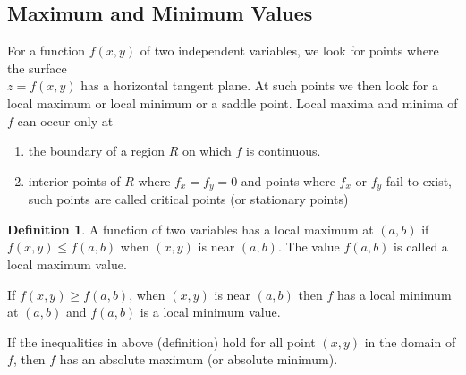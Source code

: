\documentclass[11pt,a4paper]{article}
\theoremstyle{definition}
\newtheorem{defn}[thm]{Definition}
\begin{document}
\subsection{Maximum and Minimum Values}
For a function $f(x,y)$ of two independent variables, we look for points where the surface\\ $z = f(x,y)$ has a horizontal tangent plane. At such points we then look for a local maximum or local minimum or a saddle point. Local maxima and minima of $f$ can occur only at 
\begin{enumerate}
\item the boundary of a region $R$ on which $f$ is continuous.
\item interior points of $R$ where $f_x = f_y = 0$ and points where $f_x$ or $f_y$ fail to exist, such points are called critical points (or stationary points)
\end{enumerate}

\begin{defn}


A function of two variables has a local maximum at $(a,b)$ if $f(x,y)\leq f(a,b)$ when $(x,y)$ is near $(a,b)$. The value $f(a,b)$ is called a local maximum value.


If $f(x,y)\geq f(a,b)$, when $(x,y)$ is near $(a,b)$ then $f$ has a local minimum at $(a,b)$ and $f(a,b)$ is a local minimum value.


If the inequalities in above (definition) hold for all point $(x,y)$ in the domain of $f$, then $f$ has an absolute maximum (or absolute minimum).
\end{defn}
\end{document}
